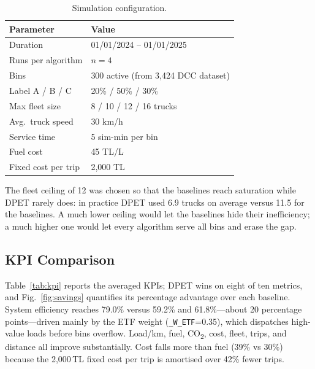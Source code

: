 \documentclass[conference, a4paper]{IEEEtran}
\begin{document}
\begin{table}[t]
\centering
\caption{Simulation configuration.}
\label{tab:config}
\footnotesize
\begin{tabular}{ll}
\toprule
\textbf{Parameter} & \textbf{Value} \\
\midrule
Duration            & 01/01/2024 -- 01/01/2025 \\
Runs per algorithm  & $n=4$ \\
Bins                & 300 active (from 3{,}424 DCC dataset) \\
Label A / B / C     & 20\% / 50\% / 30\% \\
Max fleet size      & 8 / 10 / 12 / 16 trucks \\
Avg.\ truck speed   & 30 km/h \\
Service time        & 5 sim-min per bin \\
Fuel cost           & 45 TL/L \\
Fixed cost per trip & 2{,}000 TL \\
\bottomrule
\end{tabular}
\end{table}

The fleet ceiling of 12 was chosen so that the baselines reach saturation while DPET rarely does: in practice DPET used 6.9 trucks on average versus 11.5 for the baselines. A much lower ceiling would let the baselines hide their inefficiency; a much higher one would let every algorithm serve all bins and erase the gap.

\subsection{KPI Comparison}
Table~\ref{tab:kpi} reports the averaged KPIs; DPET wins on eight of ten metrics, and Fig.~\ref{fig:savings} quantifies its percentage advantage over each baseline. System efficiency reaches 79.0\% versus 59.2\% and 61.8\%---about 20 percentage points---driven mainly by the ETF weight (\texttt{\_W\_ETF}=0.35), which dispatches high-value loads before bins overflow. Load/km, fuel, CO\textsubscript{2}, cost, fleet, trips, and distance all improve substantially. Cost falls more than fuel (39\% vs 30\%) because the 2{,}000\,TL fixed cost per trip is amortised over 42\% fewer trips.
\end{document}
